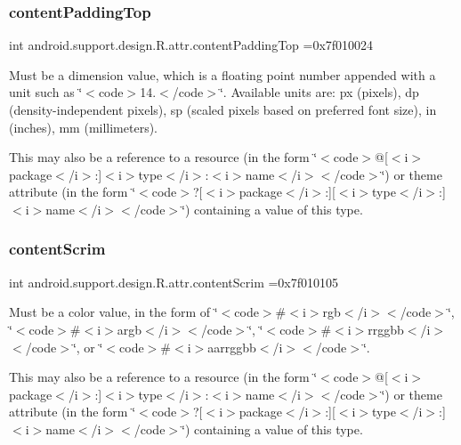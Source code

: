 \subsubsection{\texorpdfstring{content\+Padding\+Top}{contentPaddingTop}}
{\footnotesize\ttfamily int android.\+support.\+design.\+R.\+attr.\+content\+Padding\+Top =0x7f010024\hspace{0.3cm}{\ttfamily [static]}}

Must be a dimension value, which is a floating point number appended with a unit such as \char`\"{}$<$code$>$14.\+5sp$<$/code$>$\char`\"{}. Available units are\+: px (pixels), dp (density-\/independent pixels), sp (scaled pixels based on preferred font size), in (inches), mm (millimeters). 

This may also be a reference to a resource (in the form \char`\"{}$<$code$>$@\mbox{[}$<$i$>$package$<$/i$>$\+:\mbox{]}$<$i$>$type$<$/i$>$\+:$<$i$>$name$<$/i$>$$<$/code$>$\char`\"{}) or theme attribute (in the form \char`\"{}$<$code$>$?\mbox{[}$<$i$>$package$<$/i$>$\+:\mbox{]}\mbox{[}$<$i$>$type$<$/i$>$\+:\mbox{]}$<$i$>$name$<$/i$>$$<$/code$>$\char`\"{}) containing a value of this type. \mbox{\label{classandroid_1_1support_1_1design_1_1R_1_1attr_a244937ae170a7899c67a98528a168397}} 
\subsubsection{\texorpdfstring{content\+Scrim}{contentScrim}}
{\footnotesize\ttfamily int android.\+support.\+design.\+R.\+attr.\+content\+Scrim =0x7f010105\hspace{0.3cm}{\ttfamily [static]}}

Must be a color value, in the form of \char`\"{}$<$code$>$\#$<$i$>$rgb$<$/i$>$$<$/code$>$\char`\"{}, \char`\"{}$<$code$>$\#$<$i$>$argb$<$/i$>$$<$/code$>$\char`\"{}, \char`\"{}$<$code$>$\#$<$i$>$rrggbb$<$/i$>$$<$/code$>$\char`\"{}, or \char`\"{}$<$code$>$\#$<$i$>$aarrggbb$<$/i$>$$<$/code$>$\char`\"{}. 

This may also be a reference to a resource (in the form \char`\"{}$<$code$>$@\mbox{[}$<$i$>$package$<$/i$>$\+:\mbox{]}$<$i$>$type$<$/i$>$\+:$<$i$>$name$<$/i$>$$<$/code$>$\char`\"{}) or theme attribute (in the form \char`\"{}$<$code$>$?\mbox{[}$<$i$>$package$<$/i$>$\+:\mbox{]}\mbox{[}$<$i$>$type$<$/i$>$\+:\mbox{]}$<$i$>$name$<$/i$>$$<$/code$>$\char`\"{}) containing a value of this type. \mbox{\label{classandroid_1_1support_1_1design_1_1R_1_1attr_a57739b7431147c97b63f735fadc35054}} 
